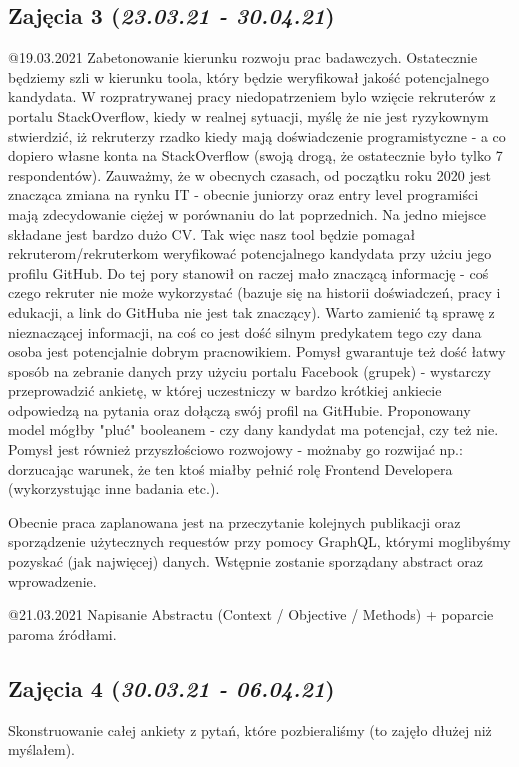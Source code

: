 \documentclass[graybox]{svmult}
\begin{document}
\subsection{Zajęcia 3 (\emph{23.03.21 - 30.04.21})}
@19.03.2021 Zabetonowanie kierunku rozwoju prac badawczych. Ostatecznie będziemy szli w kierunku toola, który będzie weryfikował jakość potencjalnego kandydata. W rozpratrywanej pracy niedopatrzeniem bylo wzięcie rekruterów z portalu StackOverflow, kiedy w realnej sytuacji, myślę że nie jest ryzykownym stwierdzić, iż rekruterzy rzadko kiedy mają doświadczenie programistyczne - a co dopiero własne konta na StackOverflow (swoją drogą, że ostatecznie było tylko 7 respondentów). Zauważmy, że w obecnych czasach, od początku roku 2020 jest znacząca zmiana na rynku IT - obecnie juniorzy oraz entry level programiści mają zdecydowanie ciężej w porównaniu do lat poprzednich. Na jedno miejsce składane jest bardzo dużo CV. Tak więc nasz tool będzie pomagał rekruterom/rekruterkom weryfikować potencjalnego kandydata przy użciu jego profilu GitHub. Do tej pory stanowił on raczej mało znaczącą informację - coś czego rekruter nie może wykorzystać (bazuje się na historii doświadczeń, pracy i edukacji, a link do GitHuba nie jest tak znaczący). Warto zamienić tą sprawę z nieznaczącej informacji, na coś co jest dość silnym predykatem tego czy dana osoba jest potencjalnie dobrym pracnowikiem. Pomysł gwarantuje też dość łatwy sposób na zebranie danych przy użyciu portalu Facebook (grupek) - wystarczy przeprowadzić ankietę, w której uczestniczy w bardzo krótkiej ankiecie odpowiedzą na pytania oraz dołączą swój profil na GitHubie. Proponowany model mógłby "pluć" booleanem - czy dany kandydat ma potencjał, czy też nie. Pomysł jest również przyszłościowo rozwojowy - możnaby go rozwijać np.: dorzucając warunek, że ten ktoś miałby pełnić rolę Frontend Developera (wykorzystując inne badania etc.). 

Obecnie praca zaplanowana jest na przeczytanie kolejnych publikacji oraz sporządzenie użytecznych requestów przy pomocy GraphQL, którymi moglibyśmy pozyskać (jak najwięcej) danych. Wstępnie zostanie sporządany abstract oraz wprowadzenie.

@21.03.2021 Napisanie Abstractu (Context / Objective / Methods) + poparcie paroma źródłami.
\subsection{Zajęcia 4 (\emph{30.03.21 - 06.04.21})}

Skonstruowanie całej ankiety z pytań, które pozbieraliśmy (to zajęło dłużej niż myślałem).
\end{document}
